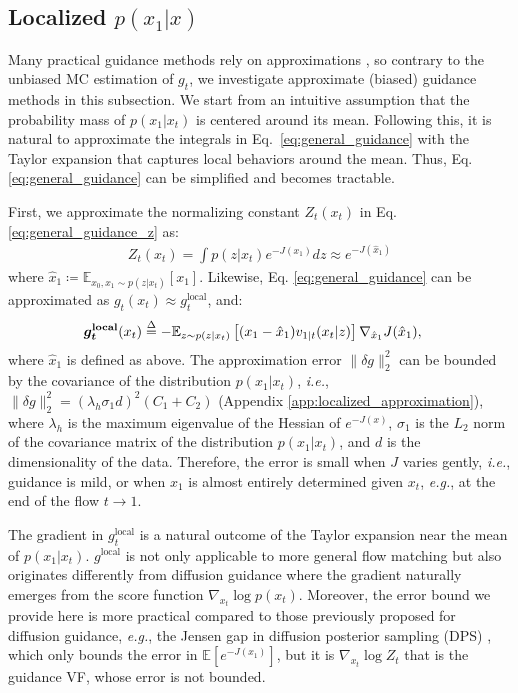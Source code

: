 \subsection{Localized $p(x_1|x)$}\label{sec:method_localized_posterior}


Many practical guidance methods rely on approximations \citep{song_loss-guided_2023,pokle_training-free_2024}, so contrary to the unbiased MC estimation of $g_t$, we investigate approximate (biased) guidance methods in this subsection.
We start from an intuitive assumption that the probability mass of $p(x_1|x_t)$ is centered around its mean. Following this, it is natural to approximate the integrals in Eq.~\eqref{eq:general_guidance} with the Taylor expansion that captures local behaviors around the mean. Thus, Eq. \eqref{eq:general_guidance} can be simplified and becomes tractable. 

First, we approximate the normalizing constant $Z_t(x_t)$ in Eq. \eqref{eq:general_guidance_z} as:
\begin{align}
Z_t(x_t) = \int p(z|x_t) e^{-J(x_1)} dz  
\approx e^{-J(\hat{x}_1)}\label{eq:approx_1order_z_uncoupled_approximation}
\end{align}
where $\hat{x}_1 \coloneqq \mathbb{E}_{x_0,x_1\sim p(z|x_t)}[x_1]$. 
Likewise, Eq. \eqref{eq:general_guidance} can be approximated as $g_t(x_t) \approx g_t^{\text{local}}$, and:
\begin{align}
    &\bm{g_t}^{\textbf{local}}(x_t)\nonumber
\label{eq:local_approx_guidance_initial}    \overset{\Delta}{=} -\mathbb{E}_{z \sim p(z|x_t)}
    \left[
     (x_1 - \hat{x}_1)v_{1|t}(x_t|z)
    \right] \nabla_{\hat{x}_1} J(\hat{x}_1),
\end{align}
where $\hat{x}_1$ is defined as above. The approximation error $\|\delta g\|_2^2$ can be bounded by the covariance of the distribution $p(x_1|x_t)$, \textit{i.e.}, $\|\delta g\|^2_2 = (\lambda_h \sigma_1 d)^2(C_1+C_2)$ (Appendix \ref{app:localized_approximation}), where $\lambda_h$ is the maximum eigenvalue of the Hessian of $e^{-J(x)}$, $\sigma_1$ is the $L_2$ norm of the covariance matrix of the distribution $p(x_1|x_t)$, and $d$ is the dimensionality of the data. Therefore, the error is small when $J$ varies gently, \textit{i.e.}, guidance is mild, or when $x_1$ is almost entirely determined given $x_t$, \textit{e.g.}, at the end of the flow $t\rightarrow 1$.

The gradient in $g_t^{\text{local}}$ is a natural outcome of the Taylor expansion near the mean of $p(x_1|x_t)$. $g^{\text{local}}$ is not only applicable to more general flow matching but also originates differently from diffusion guidance \citep{dhariwal_diffusion_2021} where the gradient naturally emerges from the score function $\nabla_{x_t}\log p(x_t)$. Moreover, the error bound we provide here is more practical compared to those previously proposed for diffusion guidance, \textit{e.g.}, the Jensen gap in diffusion posterior sampling (DPS) \citep{chung_diffusion_2024}, which only bounds the error in $\mathbb{E}[e^{-J(x_1)}]$, but it is $\nabla_{x_t}\log Z_t$ that is the guidance VF, whose error is not bounded. 

